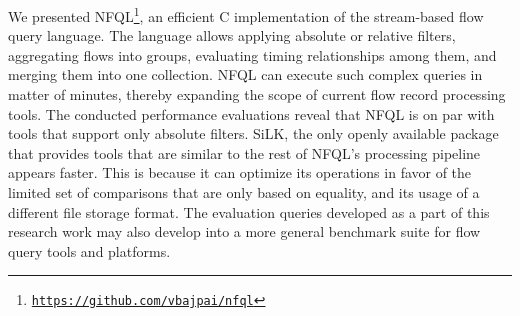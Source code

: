 We presented
\ac{NFQL}\footnote{\texttt{\url{https://github.com/vbajpai/nfql}}}, an
efficient C implementation of the stream-based flow query language. The
language allows applying absolute or relative filters, aggregating flows
into groups, evaluating timing relationships among them, and merging them into
one collection. \ac{NFQL} can execute such complex queries in matter of
minutes, thereby expanding the scope of current flow record processing tools.
The conducted performance evaluations reveal that \ac{NFQL} is on par with
tools that support only absolute filters. SiLK, the only openly available
package that provides tools that are similar to the rest of \ac{NFQL}'s
processing pipeline appears faster. This is because it can optimize its
operations in favor of the limited set of comparisons that are only based on
equality, and its usage of a different file storage format. The evaluation
queries developed as a part of this research work may also develop into a more
general benchmark suite for flow query tools and platforms.
